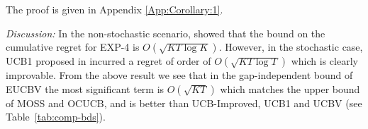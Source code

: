 The proof is given in Appendix \ref{App:Corollary:1}.

\emph{Discussion:} In the non-stochastic scenario, \citet{auer2002nonstochastic} showed that the bound on the cumulative regret for EXP-4 is $O\left(\sqrt{KT\log K}\right)$. However, in the stochastic case, UCB1 proposed in \citet{auer2002finite} incurred a regret of order of  $O\left(\sqrt{KT\log T}\right)$ which is clearly improvable. From the above result we see that in the gap-independent bound of EUCBV the most significant term is $O\left(\sqrt{KT}\right)$ which  matches the upper bound of MOSS and OCUCB, and is better than UCB-Improved, UCB1 and UCBV (see Table~\ref{tab:comp-bds}).



%
%
